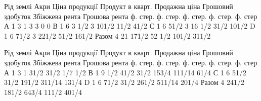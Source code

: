 Рід землі    Акри    Ціна продукції    Продукт в кварт. Продажна  ціна    Грошовий  здобуток
Збіжжева рента    Грошова  рента
        ф. стер. ф. стер. ф. стер. ф. стер. ф. стер
А 1 3 1 3 3 0 0
В                    1    6    3 1/2    3    101/2    11/2    41/2
С                    1    6    51/2    3    16 1/2    31/2    101/2
D                    1    6    71/2    3    221/2    51/2    161/2
Разом          4    21    171/2        52 1/2    101/2    311/2

Рід землі    Акри    Ціна продукції    Продукт в кварт. Продажна  ціна    Грошовий  здобуток
Збіжжева рента    Грошова  рента
        ф. стер. ф. стер. ф. стер. ф. стер. ф. стер
А                    1    3             1            31/2       31/2        1/7            1/2
В                    1    9 1/2       41/2    31/2       153/4        111/14    61/4
С                    1    6             51/2    31/2        191/2        311/14    131/4
D                    1    6             71/2    31/2        261/2        511/14     201/4
Разом           4    241/2    181/2           643/4    111/2            401/4
\parbreak{}  %
